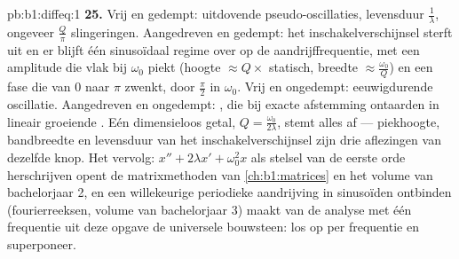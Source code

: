 \begin{solution}{pb:b1:diffeq:1}
\textbf{25.} Vrij en gedempt: uitdovende pseudo-oscillaties, levensduur
$\frac1\lambda$, ongeveer $\frac Q\pi$ slingeringen. Aangedreven en
gedempt: het inschakelverschijnsel sterft uit en er blijft één
sinusoïdaal regime over op de aandrijffrequentie, met een amplitude die
vlak bij $\omega_0$ piekt (hoogte $\approx Q \times$ statisch, breedte
$\approx \frac{\omega_0}Q$) en een fase die van $0$ naar $\pi$ zwenkt,
door $\frac\pi2$ in $\omega_0$. Vrij en ongedempt: eeuwigdurende
oscillatie. Aangedreven en ongedempt: , die bij exacte
afstemming ontaarden in lineair groeiende . Eén dimensieloos
getal, $Q = \frac{\omega_0}{2\lambda}$, stemt alles af --- piekhoogte,
bandbreedte en levensduur van het inschakelverschijnsel zijn drie
aflezingen van dezelfde knop. Het vervolg: $x'' + 2\lambda x' +
\omega_0^2x$ als stelsel van de eerste orde herschrijven opent de
matrixmethoden van \cref{ch:b1:matrices} en het volume van bachelorjaar
2, en een willekeurige periodieke aandrijving in sinusoïden ontbinden
(fourierreeksen, volume van bachelorjaar 3) maakt van de analyse met één
frequentie uit deze opgave de universele bouwsteen: los op per frequentie
en superponeer.
\end{solution}
